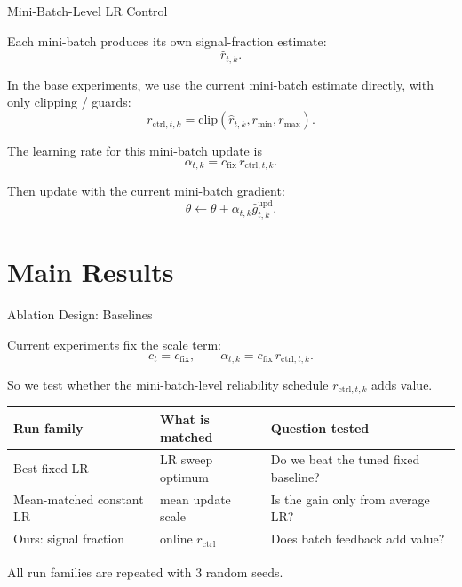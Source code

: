 \documentclass[aspectratio=169]{beamer}
\begin{document}
\begin{frame}{Mini-Batch-Level LR Control}
\small

Each mini-batch produces its own signal-fraction estimate:
\[
  \hat r_{t,k}.
\]

\vspace{0.7em}

In the base experiments, we use the current mini-batch estimate directly,
with only clipping / guards:
\[
  r_{\mathrm{ctrl},t,k}
  =
  \mathrm{clip}
  \left(
    \hat r_{t,k},
    r_{\min},
    r_{\max}
  \right).
\]

\vspace{0.8em}

The learning rate for this mini-batch update is
\[
  \alpha_{t,k}
  =
  c_{\mathrm{fix}}\,
  r_{\mathrm{ctrl},t,k}.
\]

\vspace{0.8em}

Then update with the current mini-batch gradient:
\[
  \theta
  \leftarrow
  \theta
  +
  \alpha_{t,k}\hat g^{\mathrm{upd}}_{t,k}.
\]

\vspace{0.5em}


\end{frame}


\section{Main Results}

\begin{frame}{Ablation Design: Baselines}
\small

Current experiments fix the scale term:
\[
  c_t=c_{\mathrm{fix}},
  \qquad
  \alpha_{t,k}=c_{\mathrm{fix}}\,r_{\mathrm{ctrl},t,k}.
\]

\vspace{0.7em}

So we test whether the mini-batch-level reliability schedule
\(r_{\mathrm{ctrl},t,k}\) adds value.

\vspace{0.6em}

\begin{center}
\scriptsize
\begin{tabular}{lll}
\toprule
Run family & What is matched & Question tested \\
\midrule
Best fixed LR
& LR sweep optimum
& Do we beat the tuned fixed baseline? \\
Mean-matched constant LR
& mean update scale
& Is the gain only from average LR? \\
Ours: signal fraction
& online \(r_{\mathrm{ctrl}}\)
& Does batch feedback add value? \\
\bottomrule
\end{tabular}
\end{center}

\vspace{0.4em}

{\footnotesize\color{Muted}
All run families are repeated with 3 random seeds.
}

\end{frame}
\end{document}
